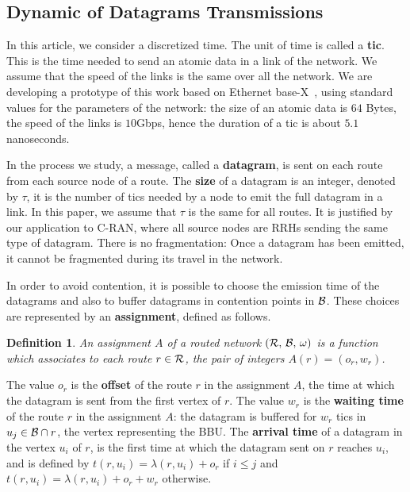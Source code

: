 \documentclass[a4paper,10pt]{journal}
\newtheorem{definition}{Definition}
\begin{document}
	 
	 
 	\subsection{Dynamic of Datagrams Transmissions}
	    
 		In this article, we consider a discretized time. The unit of time is called a {\bf tic}. This is the time needed to send an atomic data in a link of the network. We assume that the speed of the links is the same over all the network. We are developing a prototype of this work based on Ethernet base-X~\cite{ieee_8023}, using standard values for the parameters of the network: the size of an atomic data is $64$ Bytes, the speed of the links is $10$Gbps, hence the duration of a tic is about $5.1$ nanoseconds. 

        In the process we study, a message, called a {\bf datagram}, is sent on each route from each source node of a route. The \textbf{size} of a datagram is an integer, denoted by $\tau$, it is the number of tics needed by a node to emit the full datagram in a link. In this paper, we assume that $\tau$ is the same for all routes. It is justified by our application to C-RAN, where all source nodes are RRHs sending the same type of datagram. There is no fragmentation: Once a datagram has been emitted, it cannot be fragmented during its travel in the network. 

        In order to avoid contention, it is possible to choose the emission time of the datagrams and also to buffer datagrams in contention points in $\cal{B}$.
        These choices are represented by an \textbf{assignment}, defined as follows.

         \begin{definition}
         An assignment $A$ of a routed network $(\cal{R},\,\cal{B},\,\omega)$ is a function which associates to each route $r \in \cal{R}$, the pair of integers $A(r) = (o_r,w_r)$.
         \end{definition}
        The value $o_r$ is the \textbf{offset} of the route $r$ in the assignment $A$, the time at which the datagram is sent from the first vertex of $r$.
         The value $w_r$ is the \textbf{waiting time} of the route $r$ in the assignment $A$: the datagram is buffered for $w_r$ tics in $u_j \in {\cal B} \cap r$, the vertex representing the BBU.
 		The \textbf{arrival time} of a datagram in the vertex $u_i$ of $r$, is the first time at which the datagram sent on $r$ reaches $u_i$, and is defined by $t(r,u_i) = \lambda(r,u_i) + o_r $ if 
 		$i \leq j$ and $t(r,u_i) = \lambda(r,u_i) + o_r + w_r$ otherwise.
\end{document}
